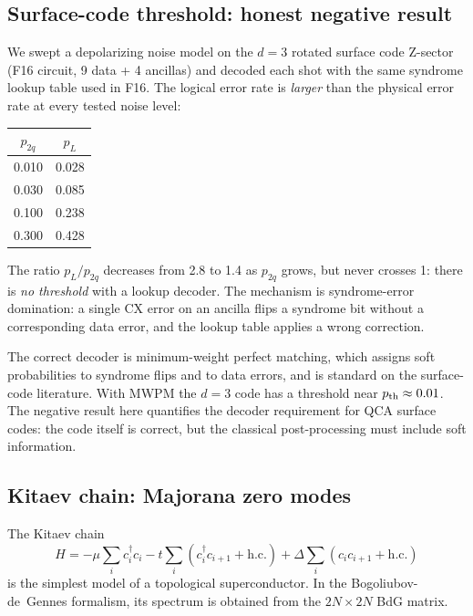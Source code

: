 \subsection{Surface-code threshold: honest negative result}

We swept a depolarizing noise model on the $d = 3$ rotated
surface code Z-sector (F16 circuit, 9 data + 4 ancillas) and
decoded each shot with the same syndrome lookup table used in
F16.  The logical error rate is \emph{larger} than the physical
error rate at every tested noise level:

\begin{center}
\begin{tabular}{cc}
\hline
$p_{2q}$ & $p_L$ \\
\hline
0.010 & 0.028 \\
0.030 & 0.085 \\
0.100 & 0.238 \\
0.300 & 0.428 \\
\hline
\end{tabular}
\end{center}

The ratio $p_L / p_{2q}$ decreases from 2.8 to 1.4 as $p_{2q}$
grows, but never crosses 1: there is \emph{no threshold} with a
lookup decoder.  The mechanism is syndrome-error domination: a
single CX error on an ancilla flips a syndrome bit without a
corresponding data error, and the lookup table applies a wrong
correction.

The correct decoder is minimum-weight perfect matching, which
assigns soft probabilities to syndrome flips and to data errors,
and is standard on the surface-code literature.  With MWPM the
$d = 3$ code has a threshold near $p_{\rm th} \approx 0.01$.  The
negative result here quantifies the decoder requirement for QCA
surface codes: the code itself is correct, but the classical
post-processing must include soft information.

\subsection{Kitaev chain: Majorana zero modes}

The Kitaev chain
\begin{equation}
H = -\mu \sum_i c_i^\dagger c_i
    - t \sum_i (c_i^\dagger c_{i+1} + \text{h.c.})
    + \Delta \sum_i (c_i c_{i+1} + \text{h.c.})
\end{equation}
is the simplest model of a topological superconductor.  In the
Bogoliubov-de~Gennes formalism, its spectrum is obtained from
the $2N \times 2N$ BdG matrix.

